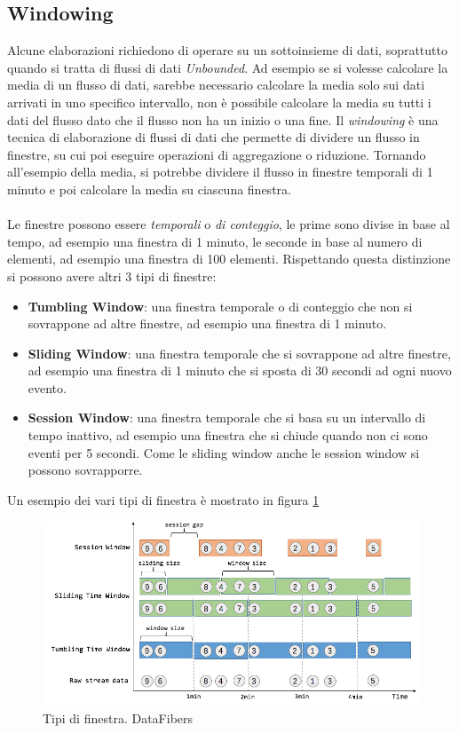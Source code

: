 \subsection{Windowing}
\label{subsec:flink_windowing}
Alcune elaborazioni richiedono di operare su un sottoinsieme di dati, soprattutto quando si tratta di flussi di dati \textit{Unbounded}.
Ad esempio se si volesse calcolare la media di un flusso di dati, sarebbe necessario calcolare la media solo sui dati arrivati in uno specifico intervallo, 
non è possibile calcolare la media su tutti i dati del flusso dato che il flusso non ha un inizio o una fine.
Il \textit{windowing} è una tecnica di elaborazione di flussi di dati che permette di dividere un flusso in finestre,
su cui poi eseguire operazioni di aggregazione o riduzione.
Tornando all'esempio della media, si potrebbe dividere il flusso in finestre temporali di 1 minuto e poi calcolare la media su ciascuna finestra.\\\\
Le finestre possono essere \textit{temporali} o \textit{di conteggio}, le prime sono divise in base al tempo, ad esempio una finestra di 1 minuto,
le seconde in base al numero di elementi, ad esempio una finestra di 100 elementi.
Rispettando questa distinzione si possono avere altri 3 tipi di finestre:
\begin{itemize}
    \item \textbf{Tumbling Window}: una finestra temporale o di conteggio che non si sovrappone ad altre finestre, ad esempio una finestra di 1 minuto.
    \item \textbf{Sliding Window}: una finestra temporale che si sovrappone ad altre finestre, ad esempio una finestra di 1 minuto che si sposta di 30 secondi ad ogni nuovo evento.
    \item \textbf{Session Window}: una finestra temporale che si basa su un intervallo di tempo inattivo, ad esempio una finestra che si chiude quando non ci sono eventi per 5 secondi.
    Come le sliding window anche le session window si possono sovrapporre.
\end{itemize}
Un esempio dei vari tipi di finestra è mostrato in figura \ref{fig:flink_window}

\begin{figure}[htbp]
    \centering
    \includegraphics[width=\textwidth]{images/flink/windows.png}
    \caption{Tipi di finestra. DataFibers \cite{flinkWindowing}}
    \label{fig:flink_window}
\end{figure}

